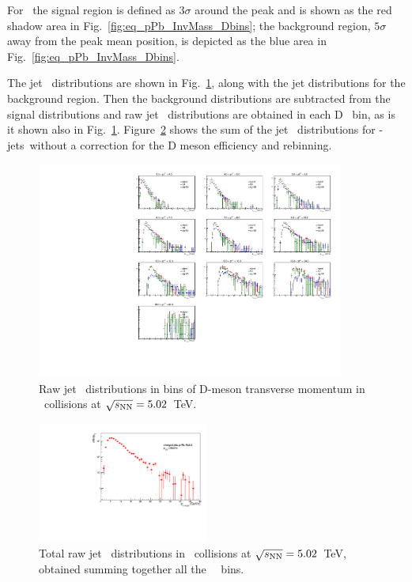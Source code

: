For \pPb\ the signal region is defined as $3\sigma$ around the peak and is shown as the red shadow area in Fig.~\ref{fig:eq_pPb_InvMass_Dbins};
the background region, $5\sigma$ away from the peak mean position, is depicted as the blue area in Fig.~\ref{fig:eq_pPb_InvMass_Dbins}.

The jet \pt\ distributions are shown in Fig.~\ref{fig:eq_pPb_signBkgJet_Dbins}, along with the jet distributions for the background region. 
Then the background distributions are subtracted from the signal distributions and raw jet \pt\ distributions are obtained in each D \pt\ bin, as is it shown also in Fig.~\ref{fig:eq_pPb_signBkgJet_Dbins}.
Figure~\ref{fig:eq_pPb_signBkgJet_tot} shows the sum of the jet \pt\ distributions for \Dstar-jets\ without a correction for the D meson efficiency and rebinning.

\begin{figure}[bth]
\centering
\includegraphics[width=0.9\textwidth]{pPbplots/plotsSB_noEff_pt3_noDetails/jetRawSpectrumFASTwoSDD}
\caption{Raw jet \pt\ distributions in bins of D-meson transverse momentum in \pPb\ collisions at $\sqrt{s_{\rm NN}}=5.02$~TeV.}
\label{fig:eq_pPb_signBkgJet_Dbins}
\end{figure}

\begin{figure}[bth]
\centering
\includegraphics[width=0.5\textwidth]{pPbplots/plotsSB_noEff_pt3_noDetails/jetPtSpectrum_SB_FASTwoSDD}
\caption{Total raw jet \pt\ distributions in \pPb\ collisions at $\sqrt{s_{\rm NN}}=5.02$~TeV, obtained summing together all the \Dstar\ \pt\ bins.}
\label{fig:eq_pPb_signBkgJet_tot}
\end{figure}

